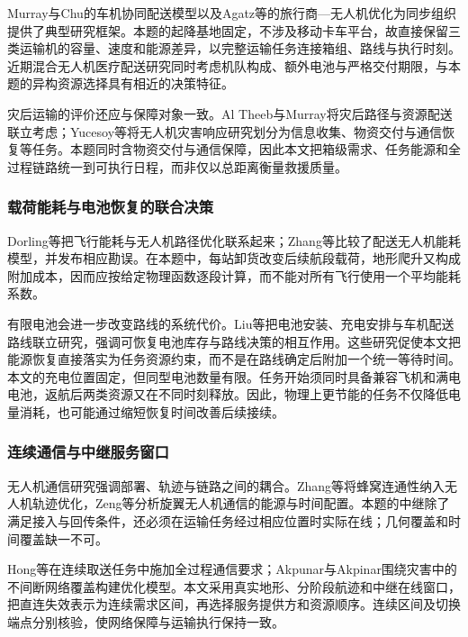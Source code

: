 \documentclass[withoutpreface,colorprint]{format}
\numberwithin{equation}{section}
\numberwithin{figure}{section}
\numberwithin{table}{section}
\begin{document}
Murray与Chu的车机协同配送模型\cite{murray2015fstsp}以及Agatz等的旅行商—无人机优化\cite{agatz2018}为同步组织提供了典型研究框架。本题的起降基地固定，不涉及移动卡车平台，故直接保留三类运输机的容量、速度和能源差异，以完整运输任务连接箱组、路线与执行时刻。近期混合无人机医疗配送研究同时考虑机队构成、额外电池与严格交付期限\cite{bhuiyan2026}，与本题的异构资源选择具有相近的决策特征。

灾后运输的评价还应与保障对象一致。Al Theeb与Murray将灾后路径与资源配送联立考虑\cite{altheeb2017relief}；Yucesoy等将无人机灾害响应研究划分为信息收集、物资交付与通信恢复等任务\cite{yucesoy2025}。本题同时含物资交付与通信保障，因此本文把箱级需求、任务能源和全过程链路统一到可执行日程，而非仅以总距离衡量救援质量。

\subsubsection{载荷能耗与电池恢复的联合决策}
Dorling等把飞行能耗与无人机路径优化联系起来\cite{dorling2017}；Zhang等比较了配送无人机能耗模型，并发布相应勘误\cite{zhang2021energy,zhang2023corrigendum}。在本题中，每站卸货改变后续航段载荷，地形爬升又构成附加成本，因而应按给定物理函数逐段计算，而不能对所有飞行使用一个平均能耗系数。

有限电池会进一步改变路线的系统代价。Liu等把电池安装、充电安排与车机配送路线联立研究\cite{liu2025battery}，强调可恢复电池库存与路线决策的相互作用。这些研究促使本文把能源恢复直接落实为任务资源约束，而不是在路线确定后附加一个统一等待时间。本文的充电位置固定，但同型电池数量有限。任务开始须同时具备兼容飞机和满电电池，返航后两类资源又在不同时刻释放。因此，物理上更节能的任务不仅降低电量消耗，也可能通过缩短恢复时间改善后续接续。

\subsubsection{连续通信与中继服务窗口}
无人机通信研究强调部署、轨迹与链路之间的耦合\cite{zeng2016uavcom,zeng2019sky}。Zhang等将蜂窝连通性纳入无人机轨迹优化\cite{zhang2019cellular}，Zeng等分析旋翼无人机通信的能源与时间配置\cite{zeng2019energy}。本题的中继除了满足接入与回传条件，还必须在运输任务经过相应位置时实际在线；几何覆盖和时间覆盖缺一不可。

Hong等在连续取送任务中施加全过程通信要求\cite{hong2025}；Akpunar与Akpinar围绕灾害中的不间断网络覆盖构建优化模型\cite{akpunar2025}。本文采用真实地形、分阶段航迹和中继在线窗口，把直连失效表示为连续需求区间，再选择服务提供方和资源顺序。连续区间及切换端点分别核验，使网络保障与运输执行保持一致。
\end{document}
